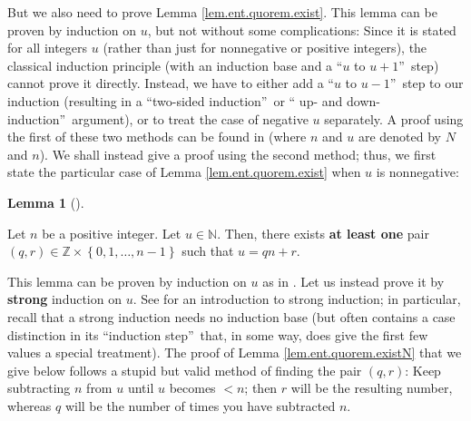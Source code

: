 \documentclass[numbers=enddot,12pt,final,onecolumn,notitlepage]{scrartcl}%
\numberwithin{exer}{subsection}
\theoremstyle{definition}
\newtheorem{lem}[theo]{Lemma}
\newenvironment{lemma}[1][]
{\begin{lem}[#1]\begin{leftbar}}
{\end{leftbar}\end{lem}}
\begin{document}
But we also need to prove Lemma \ref{lem.ent.quorem.exist}. This lemma can be
proven by induction on $u$, but not without some complications: Since it is
stated for all integers $u$ (rather than just for nonnegative or positive
integers), the classical induction principle (with an induction base and a
\textquotedblleft$u$ to $u+1$\textquotedblright\ step) cannot prove it
directly. Instead, we have to either add a \textquotedblleft$u$ to
$u-1$\textquotedblright\ step to our induction (resulting in a
\textquotedblleft two-sided induction\textquotedblright\ or \textquotedblleft
up- and down-induction\textquotedblright\ argument), or to treat the case of
negative $u$ separately. A proof using the first of these two methods can be
found in \cite[proof of Proposition 2.150]{detnotes} (where $n$ and $u$ are
denoted by $N$ and $n$). We shall instead give a proof using the second
method; thus, we first state the particular case of Lemma
\ref{lem.ent.quorem.exist} when $u$ is nonnegative:

\begin{lemma}
\label{lem.ent.quorem.existN}Let $n$ be a positive integer. Let $u\in
\mathbb{N}$. Then, there exists \textbf{at least one} pair $\left(
q,r\right)  \in\mathbb{Z}\times\left\{  0,1,\ldots,n-1\right\}  $ such that
$u=qn+r$.
\end{lemma}

This lemma can be proven by induction on $u$ as in \cite[proof of Proposition
2.150]{detnotes}. Let us instead prove it by \textbf{strong} induction on $u$.
See \cite[\S 2.8]{detnotes} for an introduction to strong induction; in
particular, recall that a strong induction needs no induction base (but often
contains a case distinction in its \textquotedblleft induction
step\textquotedblright\ that, in some way, does give the first few values a
special treatment). The proof of Lemma \ref{lem.ent.quorem.existN} that we
give below follows a stupid but valid method of finding the pair $\left(
q,r\right)  $: Keep subtracting $n$ from $u$ until $u$ becomes $<n$; then $r$
will be the resulting number, whereas $q$ will be the number of times you have
subtracted $n$.
\end{document}
